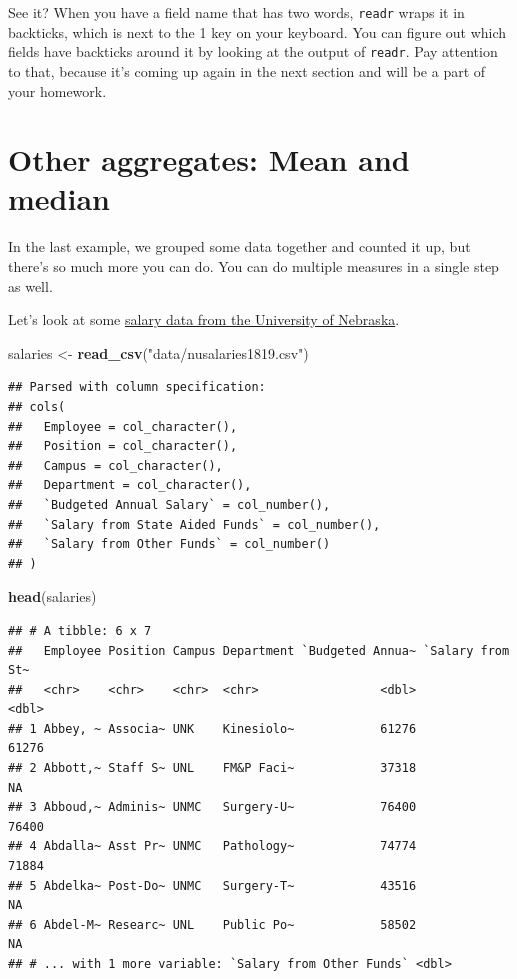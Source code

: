 \documentclass[]{book}
\newenvironment{Shaded}{\begin{snugshade}}{\end{snugshade}}
\newcommand{\KeywordTok}[1]{\textcolor[rgb]{0.13,0.29,0.53}{\textbf{#1}}}
\newcommand{\NormalTok}[1]{#1}
\newcommand{\StringTok}[1]{\textcolor[rgb]{0.31,0.60,0.02}{#1}}
\begin{document}
See it? When you have a field name that has two words, \texttt{readr} wraps it in backticks, which is next to the 1 key on your keyboard. You can figure out which fields have backticks around it by looking at the output of \texttt{readr}. Pay attention to that, because it's coming up again in the next section and will be a part of your homework.

\hypertarget{other-aggregates-mean-and-median}{%
\section{Other aggregates: Mean and median}\label{other-aggregates-mean-and-median}}

In the last example, we grouped some data together and counted it up, but there's so much more you can do. You can do multiple measures in a single step as well.

Let's look at some \href{https://unl.box.com/s/09t2u4qoncfh6qlv2156flzlxb8ruzpq}{salary data from the University of Nebraska}.

\begin{Shaded}
\begin{Highlighting}[]
\NormalTok{salaries <-}\StringTok{ }\KeywordTok{read_csv}\NormalTok{(}\StringTok{"data/nusalaries1819.csv"}\NormalTok{)}
\end{Highlighting}
\end{Shaded}

\begin{verbatim}
## Parsed with column specification:
## cols(
##   Employee = col_character(),
##   Position = col_character(),
##   Campus = col_character(),
##   Department = col_character(),
##   `Budgeted Annual Salary` = col_number(),
##   `Salary from State Aided Funds` = col_number(),
##   `Salary from Other Funds` = col_number()
## )
\end{verbatim}

\begin{Shaded}
\begin{Highlighting}[]
\KeywordTok{head}\NormalTok{(salaries)}
\end{Highlighting}
\end{Shaded}

\begin{verbatim}
## # A tibble: 6 x 7
##   Employee Position Campus Department `Budgeted Annua~ `Salary from St~
##   <chr>    <chr>    <chr>  <chr>                 <dbl>            <dbl>
## 1 Abbey, ~ Associa~ UNK    Kinesiolo~            61276            61276
## 2 Abbott,~ Staff S~ UNL    FM&P Faci~            37318               NA
## 3 Abboud,~ Adminis~ UNMC   Surgery-U~            76400            76400
## 4 Abdalla~ Asst Pr~ UNMC   Pathology~            74774            71884
## 5 Abdelka~ Post-Do~ UNMC   Surgery-T~            43516               NA
## 6 Abdel-M~ Researc~ UNL    Public Po~            58502               NA
## # ... with 1 more variable: `Salary from Other Funds` <dbl>
\end{verbatim}
\end{document}
